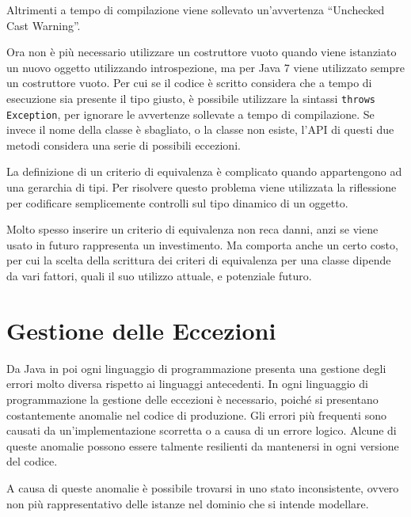 \documentclass{article}
\numberwithin{equation}{subsection}
\begin{document}

Altrimenti a tempo di compilazione viene sollevato un'avvertenza ``Unchecked Cast Warning''. 


Ora non è più necessario utilizzare un costruttore vuoto quando viene istanziato un nuovo oggetto utilizzando introspezione, ma per Java 7 viene utilizzato sempre un 
costruttore vuoto. 
Per cui se il codice è scritto considera che a tempo di esecuzione sia presente il tipo giusto, è possibile utilizzare la sintassi \verb|throws Exception|, per ignorare 
le avvertenze sollevate a tempo di compilazione. 
Se invece il nome della classe è sbagliato, o la classe non esiste, l'API di questi due metodi considera una serie di possibili eccezioni. 



La definizione di un criterio di equivalenza è complicato quando appartengono ad una gerarchia di tipi. Per risolvere questo problema viene utilizzata la riflessione 
per codificare semplicemente controlli sul tipo dinamico di un oggetto. 



Molto spesso inserire un criterio di equivalenza non reca danni, anzi se viene usato in futuro rappresenta un investimento. Ma comporta anche un certo costo, per cui la scelta 
della scrittura dei criteri di equivalenza per una classe dipende da vari fattori, quali il suo utilizzo attuale, e potenziale futuro. 

\clearpage

\section{Gestione delle Eccezioni}

Da Java in poi ogni linguaggio di programmazione presenta una gestione degli errori molto diversa rispetto ai linguaggi antecedenti. 
In ogni linguaggio di programmazione la gestione delle eccezioni è necessario, poiché si presentano costantemente anomalie nel codice di produzione.  
Gli errori più frequenti sono causati da un'implementazione scorretta o a causa di un errore logico. Alcune di queste anomalie possono essere talmente resilienti da mantenersi 
in ogni versione del codice. 

A causa di queste anomalie è possibile trovarsi in uno stato inconsistente, ovvero non più rappresentativo delle istanze nel dominio che si intende modellare. 
\end{document}

